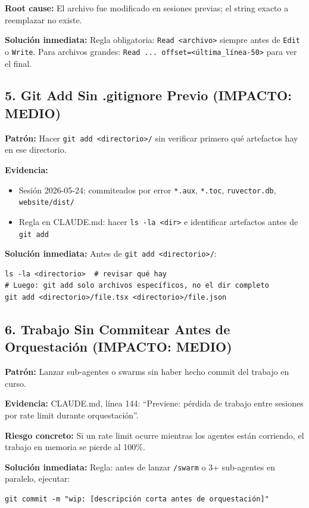 \documentclass[12pt,a4paper,spanish]{article}
\begin{document}
\textbf{Root cause:} El archivo fue modificado en sesiones previas; el string exacto a reemplazar no existe.

\textbf{Solución inmediata:}
Regla obligatoria: \texttt{Read <archivo>} siempre antes de \texttt{Edit} o \texttt{Write}.
Para archivos grandes: \texttt{Read ... offset=<última\_línea-50>} para ver el final.

\subsection{5. Git Add Sin .gitignore Previo (IMPACTO: MEDIO)}

\textbf{Patrón:} Hacer \texttt{git add <directorio>/} sin verificar primero qué artefactos hay en ese directorio.

\textbf{Evidencia:}
\begin{itemize}
  \item Sesión 2026-05-24: commiteados por error \texttt{*.aux}, \texttt{*.toc}, \texttt{ruvector.db}, \texttt{website/dist/}
  \item Regla en CLAUDE.md: hacer \texttt{ls -la <dir>} e identificar artefactos antes de \texttt{git add}
\end{itemize}

\textbf{Solución inmediata:}
Antes de \texttt{git add <directorio>/}:
\begin{lstlisting}
ls -la <directorio>  # revisar qué hay
# Luego: git add solo archivos específicos, no el dir completo
git add <directorio>/file.tsx <directorio>/file.json
\end{lstlisting}

\subsection{6. Trabajo Sin Commitear Antes de Orquestación (IMPACTO: MEDIO)}

\textbf{Patrón:} Lanzar sub-agentes o swarms sin haber hecho commit del trabajo en curso.

\textbf{Evidencia:} CLAUDE.md, línea 144: ``Previene: pérdida de trabajo entre sesiones por rate limit durante orquestación''.

\textbf{Riesgo concreto:} Si un rate limit ocurre mientras los agentes están corriendo, el trabajo en memoria se pierde al 100\%.

\textbf{Solución inmediata:}
Regla: antes de lanzar \texttt{/swarm} o 3+ sub-agentes en paralelo, ejecutar:
\begin{lstlisting}
git commit -m "wip: [descripción corta antes de orquestación]"
\end{lstlisting}
\end{document}
